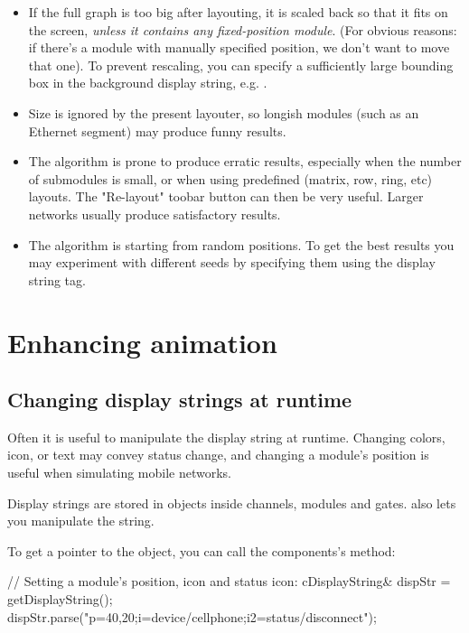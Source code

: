 \begin{itemize}
  \item If the full graph is too big after layouting, it is scaled
    back so that it fits on the screen, \textit{unless it contains
    any fixed-position module}. (For obvious reasons: if there's a module
    with manually specified position, we don't want to move that one).
    To prevent rescaling, you can specify a sufficiently large bounding
    box in the background display string, e.g. .
  \item Size is ignored by the present layouter, so longish modules
    (such as an Ethernet segment) may produce funny results.
  \item The algorithm is prone to produce erratic results, especially
    when the number of submodules is small, or when using predefined
    (matrix, row, ring, etc) layouts. The "Re-layout" toobar button
    can then be very useful. Larger networks usually produce
    satisfactory results.
  \item The algorithm is starting from random positions.
     To get the best results you may experiment with
    different seeds by specifying them using the 
    display string tag.
\end{itemize}

\section{Enhancing animation}

\subsection{Changing display strings at runtime}

Often it is useful to manipulate the display string at runtime.
Changing colors, icon, or text may convey status change, and
changing a module's position is useful when simulating mobile
networks.

Display strings are stored in  objects inside
channels, modules and gates.  also lets you
manipulate the string.

To get a pointer to the  object, you can call
the components's  method:

\begin{cpp}
// Setting a module's position, icon and status icon:
cDisplayString& dispStr = getDisplayString();
dispStr.parse("p=40,20;i=device/cellphone;i2=status/disconnect");
\end{cpp}

